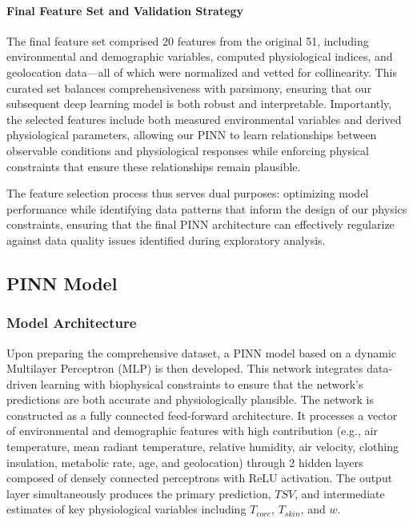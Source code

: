\paragraph{Final Feature Set and Validation Strategy} The final feature set comprised 20 features from the original 51, including environmental and demographic variables, computed physiological indices, and geolocation data—all of which were normalized and vetted for collinearity. This curated set balances comprehensiveness with parsimony, ensuring that our subsequent deep learning model is both robust and interpretable. Importantly, the selected features include both measured environmental variables and derived physiological parameters, allowing our PINN to learn relationships between observable conditions and physiological responses while enforcing physical constraints that ensure these relationships remain plausible.

The feature selection process thus serves dual purposes: optimizing model performance while identifying data patterns that inform the design of our physics constraints, ensuring that the final PINN architecture can effectively regularize against data quality issues identified during exploratory analysis.
\subsection{PINN Model}

\subsubsection{Model Architecture}
Upon preparing the comprehensive dataset, a PINN model based on a dynamic Multilayer Perceptron (MLP) is then developed. This network integrates data-driven learning with biophysical constraints to ensure that the network's predictions are both accurate and physiologically plausible. The network is constructed as a fully connected feed-forward architecture. It processes a vector of environmental and demographic features with high contribution (e.g., air temperature, mean radiant temperature, relative humidity, air velocity, clothing insulation, metabolic rate, age, and geolocation) through 2 hidden layers composed of densely connected perceptrons with ReLU activation. The output layer simultaneously produces the primary prediction, $TSV$, and intermediate estimates of key physiological variables including $T_{core}$, $T_{skin}$, and $w$. 

